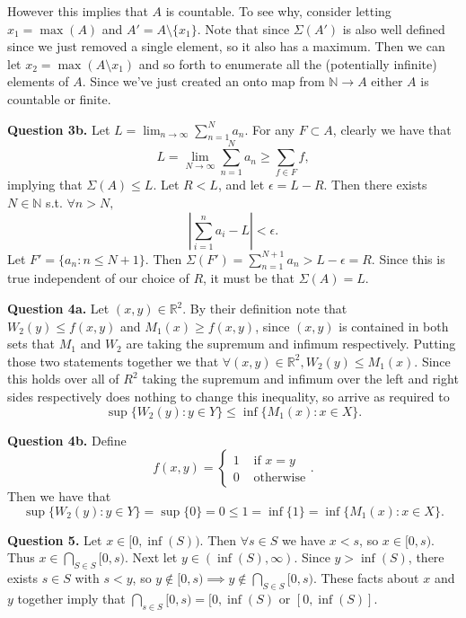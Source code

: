 \documentclass[letterpaper, reqno,11pt]{article}
\begin{document}
However this implies that $A$ is countable. To see why, consider letting $x_1=\max(A)$ and $A'=A\setminus \{x_1\}$. Note that since $\Sigma(A')$ is also well defined since we just removed a single element, so it also has a maximum. Then we can let $x_2=\max(A\setminus x_1)$ and so forth to enumerate all the (potentially infinite) elements of $A$. Since we've just created an onto map from $\mathbb{N}\to A$ either $A$ is countable or finite.

{\medskip\noindent\bf Question 3b.} Let $L=\lim_{n\to\infty}\sum_{n=1}^{N}a_n$. For any $F\subset  A$, clearly we have that
\[
L=\lim_{N\to\infty}\sum_{n=1}^{N}a_n\geq \sum_{f\in F}f
,\]
implying that $\Sigma(A)\leq L$. Let $R<L$, and let $\epsilon=L-R$. Then there exists $N\in \mathbb{N}$ s.t. $\forall n>N,$
\[
\left| \sum_{i=1}^{n}a_i-L \right|<\epsilon
.\]
Let $F'=\{a_n: n\leq N+1\}$. Then $\Sigma(F')=\sum_{n=1}^{N+1}a_n>L-\epsilon=R$. Since this is true independent of our choice of $R$, it must be that $\Sigma(A)=L$.

\newpage\phantom{blabla}
\newpage

{\medskip\noindent\bf Question 4a.} Let $(x,y)\in \mathbb{R}^2$. By their definition note that $W_2(y)\leq f(x,y)$ and $M_1(x)\geq f(x,y)$, since $(x,y)$ is contained in both sets that $M_1$ and $W_2$ are taking the supremum and infimum respectively. Putting those two statements together we that $\forall (x,y)\in \mathbb{R}^2, W_2(y)\leq M_1(x)$. Since this holds over all of $R^{2}$ taking the supremum and infimum over the left and right sides respectively does nothing to change this inequality, so arrive as required to
\[
\sup \{W_2(y): y\in Y\}\leq \inf \{M_1(x): x\in X\}
.\]

{\medskip\noindent\bf Question 4b.} Define
\[
f(x,y)=\begin{cases}
    1&\text{ if } x=y\\
    0&\text{ otherwise}
\end{cases}
.\]
Then we have that
\[
\sup \{W_2(y): y\in Y\}=\sup \{0\}= 0\leq 1= \inf \{1\}=\inf \{M_1(x): x\in X\}
.\]

\newpage\phantom{blabla}
\newpage

{\medskip\noindent\bf Question 5.} Let $x\in [0,\inf(S))$. Then $\forall s\in S$ we have $x<s$, so $x\in [0,s)$. Thus $x\in \bigcap_{S\in S}[0,s)$. Next let $y\in (\inf(S), \infty)$. Since $y>\inf(S)$, there exists $s\in S$ with $s<y$, so $y\notin [0,s)\implies y\notin \bigcap_{S\in S}[0,s)$. These facts about $x$ and $y$ together imply that $\bigcap_{s\in S}[0,s)=[0,\inf(S)$ or $[0,\inf(S)]$.
\end{document}
